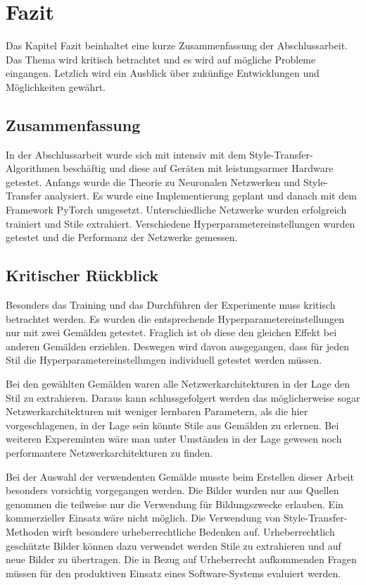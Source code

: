 \chapter{Fazit}

Das Kapitel Fazit beinhaltet eine kurze Zusammenfassung der Abschlussarbeit. Das Thema wird kritisch betrachtet und es wird auf mögliche Probleme eingangen. Letzlich wird ein Ausblick über zukünfige Entwicklungen und Möglichkeiten gewährt.

\section{Zusammenfassung}

In der Abschlussarbeit wurde sich mit intensiv mit dem Style-Transfer-Algorithmen beschäftig und diese auf Geräten mit leistungsarmer Hardware getestet. Anfangs wurde die Theorie zu Neuronalen Netzwerken und Style-Transfer analysiert. Es wurde eine Implementierung geplant und danach mit dem Framework PyTorch umgesetzt. Unterschiedliche Netzwerke wurden erfolgreich trainiert und Stile extrahiert. Verschiedene Hyperparametereinstellungen wurden getestet und die Performanz der Netzwerke gemessen.


\section{Kritischer Rückblick}

Besonders das Training und das Durchführen der Experimente muss kritisch betrachtet werden. Es wurden die entsprechende Hyperparametereinstellungen nur mit zwei Gemälden getestet. Fraglich ist ob diese den gleichen Effekt bei anderen Gemälden erziehlen. Deswegen wird davon ausgegangen, dass für jeden Stil die Hyperparametereinstellungen individuell getestet werden müssen.

Bei den gewählten Gemälden waren alle Netzwerkarchitekturen in der Lage den Stil zu extrahieren. Daraus kann schlussgefolgert werden das möglicherweise sogar Netzwerkarchitekturen mit weniger lernbaren Parametern, als die hier vorgeschlagenen, in der Lage sein könnte Stile aus Gemälden zu erlernen. Bei weiteren Expereminten wäre man unter Umständen in der Lage gewesen noch performantere Netzwerkarchitekturen zu finden.

Bei der Auswahl der verwendenten Gemälde musste beim Erstellen dieser Arbeit besonders vorsichtig vorgegangen werden. Die Bilder wurden nur aus Quellen genommen die teilweise nur die Verwendung für Bildungszwecke erlauben. Ein kommerzieller Einsatz wäre nicht möglich. Die Verwendung von Style-Transfer-Methoden wirft besondere urheberrechtliche Bedenken auf. Urheberrechtlich geschützte Bilder können dazu verwendet werden Stile zu extrahieren und auf neue Bilder zu übertragen. Die in Bezug auf Urheberrecht aufkommenden Fragen müssen für den produktiven Einsatz eines Software-Systems evaluiert werden.

